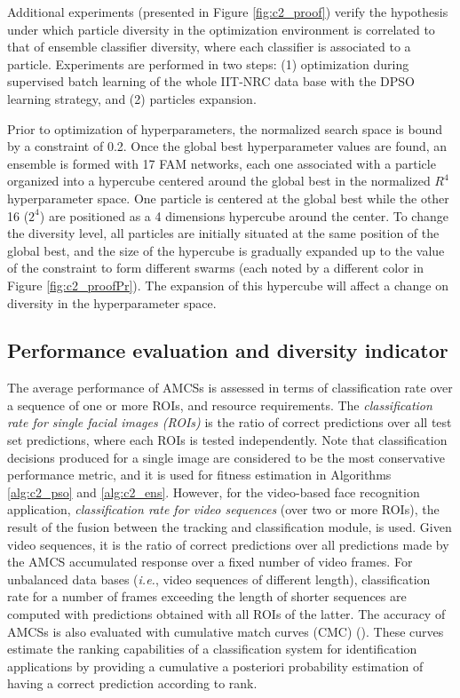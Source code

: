 Additional experiments (presented in Figure \ref{fig:c2_proof}) verify the hypothesis under which particle diversity in the optimization environment is correlated to that of ensemble classifier diversity, where each classifier is associated to a particle.
Experiments are performed in two steps: (1) optimization during supervised batch learning of the whole IIT-NRC data base with the DPSO learning strategy, and (2) particles expansion.

Prior to optimization of hyperparameters, the normalized search space is bound by a constraint of 0.2.
Once the global best hyperparameter values are found, an ensemble is formed with 17 FAM networks, each one associated with a particle organized into a hypercube centered around the global best in the normalized $R^4$ hyperparameter space.
One particle is centered at the global best while the other 16 ($2^4$) are positioned as a 4 dimensions hypercube around the center. 
To change the diversity level, all particles are initially situated at the same position of the global best, and the size of the hypercube is gradually expanded up to the value of the constraint to form different swarms (each noted by a different color in Figure \ref{fig:c2_proofPr}).
The expansion of this hypercube will affect a change on diversity in the hyperparameter space.

\subsection{Performance evaluation and diversity indicator}
\label{sec:c2_indicator}

The average performance of AMCSs is assessed in terms of classification rate over a sequence of one or more ROIs, and resource requirements.
The \emph{classification rate for single facial images (ROIs)} is the ratio of correct predictions over all test set predictions, where each ROIs is tested independently.
Note that classification decisions produced for a single image are considered to be the most conservative performance metric, and it is used for fitness estimation in Algorithms \ref{alg:c2_pso} and \ref{alg:c2_ens}.
However, for the video-based face recognition application, \emph{classification
rate for video sequences} (over two or more ROIs), the result of the fusion between the tracking and classification module, is used.
Given video sequences, it is the ratio of correct predictions over all predictions made by the AMCS accumulated response over a fixed number of video frames.
For unbalanced data bases (\emph{i.e.}, video sequences of different length), classification rate for a number of frames exceeding the length of shorter sequences are computed with predictions obtained with all ROIs of the latter.
The accuracy of AMCSs is also evaluated with cumulative match curves (CMC) (\cite{moon01}).
These curves estimate the ranking capabilities of a classification system for identification applications by providing a cumulative a posteriori probability estimation of having a correct prediction according to rank.


